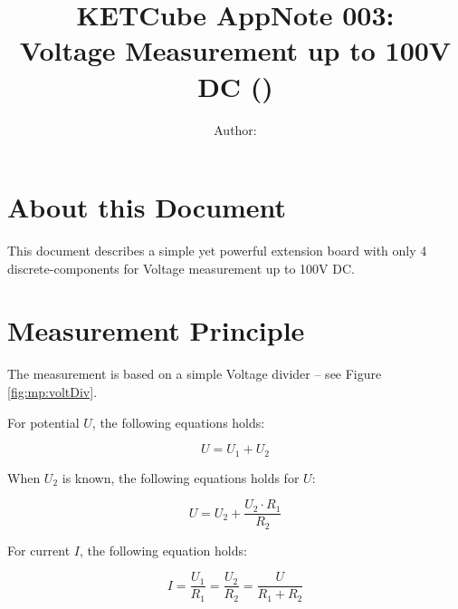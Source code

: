 \documentclass[twoside,a4paper]{refart}
\title{\UWBLogo KETCube AppNote 003:\\ Voltage Measurement up to 100V DC (\vhCurrentVersion)}
\author{Author: \vhListAllAuthors}
\begin{document}

\titlepage
\maketitle

\section*{About this Document}


This document describes a simple yet powerful extension board with only 4 discrete-components for Voltage measurement up to 100V DC.


\setcounter{tocdepth}{1}
\tableofcontents
\clearpage

\listoffigures
\listoftables
\begin{versionhistory}
\end{versionhistory}
\setcounter{table}{0}

\clearpage 
{} 
\pagestyle{headings} 

\clearpage
\section{Measurement Principle}
The measurement is based on a simple Voltage divider -- see Figure \ref{fig:mp:voltDiv}.


For potential $U$, the following equations holds:

\begin{equation}
U = U_1 + U_2
\end{equation}

When $U_2$ is known, the following equations holds for $U$:

\begin{equation}
U = U_2 + \frac{U_2 \cdot R_1}{R_2}
\end{equation}



For current $I$, the following equation holds:

\begin{equation}
I = \frac{U_1}{R_1} = \frac{U_2}{R_2} = \frac{U}{R_1 + R_2}
\end{equation}
\end{document}
